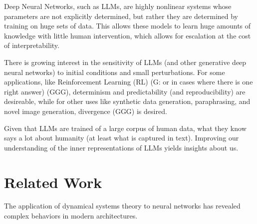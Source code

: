 \documentclass[a4paper,12pt]{article}
\begin{document}
Deep Neural Networks, such as LLMs, are highly nonlinear systems whose parameters are not explicitly determined, but rather they are determined by training on huge sets of data.
This allows these models to learn huge amounts of knowledge with little human intervention, which allows for escalation at the cost of interpretability.

There is growing interest in the sensitivity of LLMs (and other generative deep neural networks) to initial conditions and small perturbations. For some applications, like Reinforcement Learning (RL) (G: or in cases where there is one right answer) (GGG), determinism and predictability (and reproducibility) are desireable, while for other uses like synthetic data generation, paraphrasing, and novel image generation, divergence (GGG) is desired.

Given that LLMs are trained of a large corpus of human data, what they know says a lot about humanity (at least what is captured in text). Improving our understanding of the inner representations of LLMs yields insights about us.


\section{Related Work}


The application of dynamical systems theory to neural networks has revealed complex behaviors in modern architectures.  
\end{document}
